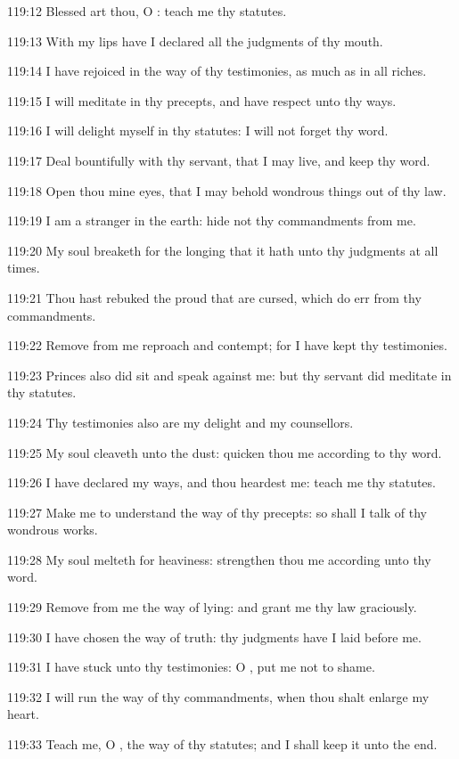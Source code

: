 119:12 Blessed art thou, O \LORD: teach me thy statutes.

119:13 With my lips have I declared all the judgments of thy mouth.

119:14 I have rejoiced in the way of thy testimonies, as much as in all riches.

119:15 I will meditate in thy precepts, and have respect unto thy ways.

119:16 I will delight myself in thy statutes: I will not forget thy word.

119:17 Deal bountifully with thy servant, that I may live, and keep thy word.

119:18 Open thou mine eyes, that I may behold wondrous things out of thy law.

119:19 I am a stranger in the earth: hide not thy commandments from me.

119:20 My soul breaketh for the longing that it hath unto thy judgments at all times.

119:21 Thou hast rebuked the proud that are cursed, which do err from thy commandments.

119:22 Remove from me reproach and contempt; for I have kept thy testimonies.

119:23 Princes also did sit and speak against me: but thy servant did meditate in thy statutes.

119:24 Thy testimonies also are my delight and my counsellors.

119:25 My soul cleaveth unto the dust: quicken thou me according to thy word.

119:26 I have declared my ways, and thou heardest me: teach me thy statutes.

119:27 Make me to understand the way of thy precepts: so shall I talk of thy wondrous works.

119:28 My soul melteth for heaviness: strengthen thou me according unto thy word.

119:29 Remove from me the way of lying: and grant me thy law graciously.

119:30 I have chosen the way of truth: thy judgments have I laid before me.

119:31 I have stuck unto thy testimonies: O \LORD, put me not to shame.

119:32 I will run the way of thy commandments, when thou shalt enlarge my heart.

119:33 Teach me, O \LORD, the way of thy statutes; and I shall keep it unto the end.

